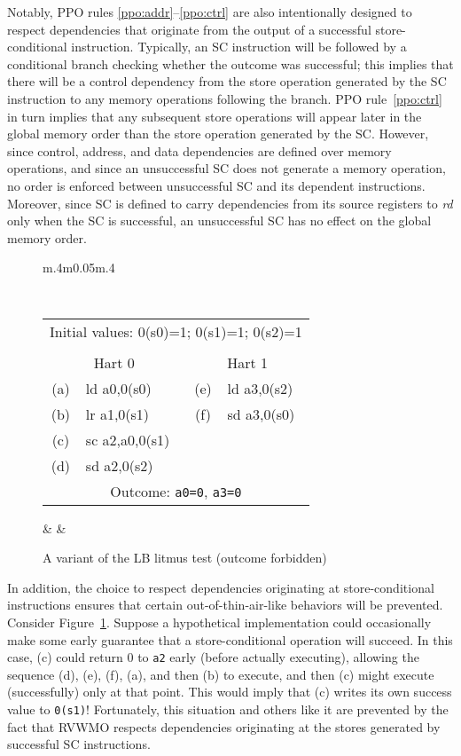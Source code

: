 Notably, PPO rules \ref{ppo:addr}--\ref{ppo:ctrl} are also intentionally designed to respect dependencies that originate from the output of a successful store-conditional instruction.
Typically, an SC instruction will be followed by a conditional branch checking whether the outcome was successful; this implies that there will be a control dependency from the store operation generated by the SC instruction to any memory operations following the branch.
PPO rule~\ref{ppo:ctrl} in turn implies that any subsequent store operations will appear later in the global memory order than the store operation generated by the SC.
However, since control, address, and data dependencies are defined over memory operations, and since an unsuccessful SC does not generate a memory operation, no order is enforced between unsuccessful SC and its dependent instructions.
Moreover, since SC is defined to carry dependencies from its source registers to {\em rd} only when the SC is successful, an unsuccessful SC has no effect on the global memory order.


\begin{figure}[h!]
  \centering
  \begin{tabular}{m{.4\linewidth}m{0.05\linewidth}m{.4\linewidth}}
  {
    \tt\small
    \begin{tabular}{cl||cl}
    \multicolumn{4}{c}{Initial values: 0(s0)=1; 0(s1)=1; 0(s2)=1} \\
    \\
    \multicolumn{2}{c}{Hart 0} & \multicolumn{2}{c}{Hart 1} \\
    \hline
      (a) & ld a0,0(s0)    & (e) & ld a3,0(s2) \\
      (b) & lr a1,0(s1)    & (f) & sd a3,0(s0) \\
      (c) & sc a2,a0,0(s1) &                    \\
      (d) & sd a2,0(s2)    &                    \\
      \hline
      \multicolumn{4}{c}{Outcome: {\tt a0=0}, {\tt a3=0}}
    \end{tabular}
  }
  & &
  
  \end{tabular}
  \caption{A variant of the LB litmus test (outcome forbidden)}
  \label{fig:litmus:successdeps}
\end{figure}

In addition, the choice to respect dependencies originating at store-conditional instructions ensures that certain out-of-thin-air-like behaviors will be prevented.
Consider Figure~\ref{fig:litmus:successdeps}.
Suppose a hypothetical implementation could occasionally make some early guarantee that a store-conditional operation will succeed.
In this case, (c) could return 0 to {\tt a2} early (before actually executing), allowing the sequence (d), (e), (f), (a), and then (b) to execute, and then (c) might execute (successfully) only at that point.
This would imply that (c) writes its own success value to {\tt 0(s1)}!
Fortunately, this situation and others like it are prevented by the fact that RVWMO respects dependencies originating at the stores generated by successful SC instructions.

